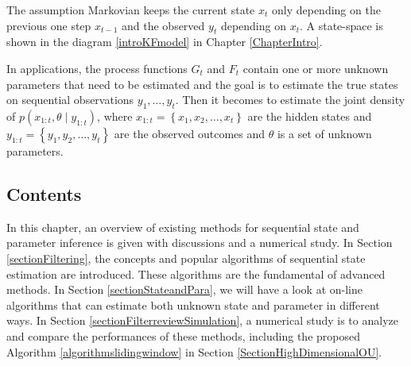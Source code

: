 The assumption Markovian keeps the current state $x_t$ only depending on the previous one step $x_{t-1}$ and the observed $y_t$ depending on $x_t$. A state-space is shown in the diagram \eqref{introKFmodel} in Chapter \ref{ChapterIntro}.

In applications, the process functions $G_t$ and $F_t$ contain one or more unknown parameters that need to be estimated \citep{de1988likelihood} and the goal is to estimate the true states on sequential observations $y_1, \ldots, y_t$. Then it becomes to estimate the joint density of $p(x_{1:t},\theta \mid y_{1:t})$, where $x_{1:t} = \left\lbrace x_1, x_2, \ldots, x_t \right\rbrace$ are the hidden states and $y_{1:t} = \left\lbrace y_1, y_2, \ldots, y_t \right\rbrace$ are the observed outcomes and $\theta$ is a set of unknown parameters. 


\subsection*{Contents}

In this chapter, an overview of existing methods for sequential state and parameter inference is given with discussions and a numerical study. In Section \ref{sectionFiltering}, the concepts and popular algorithms of sequential state estimation are introduced. These algorithms are the fundamental of advanced methods. In Section \ref{sectionStateandPara}, we will have a look at on-line algorithms that can estimate both unknown state and parameter in different ways. In Section \ref{sectionFilterreviewSimulation}, a numerical study is to analyze and compare the performances of these methods, including the proposed Algorithm \ref{algorithmslidingwindow} in Section \ref{SectionHighDimensionalOU}. 




